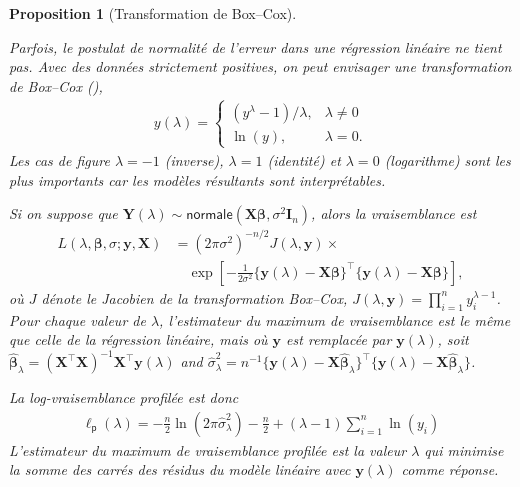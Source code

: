 \documentclass[
  11pt,
  letterpaper,
]{scrbook}
\theoremstyle{definition}
\theoremstyle{plain}
\theoremstyle{definition}
\theoremstyle{plain}
\newtheorem{proposition}{Proposition}[chapter]
\theoremstyle{remark}
\begin{document}
\begin{proposition}[Transformation de
Box--Cox]\protect\hypertarget{prp-boxcox}{}\label{prp-boxcox}

Parfois, le postulat de normalité de l'erreur dans une régression
linéaire ne tient pas. Avec des données strictement positives, on peut
envisager une transformation de Box--Cox
(), \begin{align*}
y(\lambda)= \begin{cases}
(y^{\lambda}-1)/\lambda, & \lambda \neq 0\\
\ln(y), & \lambda=0.
\end{cases}
\end{align*} Les cas de figure \(\lambda=-1\) (inverse), \(\lambda=1\)
(identité) et \(\lambda=0\) (logarithme) sont les plus importants car
les modèles résultants sont interprétables.

Si on suppose que
\(\boldsymbol{Y}(\lambda) \sim \mathsf{normale}(\mathbf{X}\boldsymbol{\beta}, \sigma^2 \mathbf{I}_n)\),
alors la vraisemblance est \begin{align*}
L(\lambda, \boldsymbol{\beta}, \sigma; \boldsymbol{y}, \mathbf{X}) &= (2\pi\sigma^2)^{-n/2} J(\lambda, \boldsymbol{y}) \times\\& \quad \exp \left[ - \frac{1}{2\sigma^2}\{\boldsymbol{y}(\lambda) - \mathbf{X}\boldsymbol{\beta}\}^\top\{\boldsymbol{y}(\lambda) - \mathbf{X}\boldsymbol{\beta}\}\right],
\end{align*} où \(J\) dénote le Jacobien de la transformation Box--Cox,
\(J(\lambda, \boldsymbol{y})=\prod_{i=1}^n y_i^{\lambda-1}\). Pour
chaque valeur de \(\lambda\), l'estimateur du maximum de vraisemblance
est le même que celle de la régression linéaire, mais où
\(\boldsymbol{y}\) est remplacée par \(\boldsymbol{y}(\lambda)\), soit
\(\widehat{\boldsymbol{\beta}}_\lambda = (\mathbf{X}^\top\mathbf{X})^{-1}\mathbf{X}^\top \boldsymbol{y}(\lambda)\)
and
\(\widehat{\sigma}^2_\lambda = n^{-1}\{ \boldsymbol{y}(\lambda) - \mathbf{X}\widehat{\boldsymbol{\beta}}_\lambda\}^\top\{ \boldsymbol{y}(\lambda) - \mathbf{X}\widehat{\boldsymbol{\beta}}_\lambda\}\).

La log-vraisemblance profilée est donc \begin{align*}
\ell_{\mathsf{p}}(\lambda) = -\frac{n}{2}\ln(2\pi \widehat{\sigma}^2_\lambda) - \frac{n}{2} + (\lambda - 1)\sum_{i=1}^n \ln(y_i)
\end{align*} L'estimateur du maximum de vraisemblance profilée est la
valeur \(\lambda\) qui minimise la somme des carrés des résidus du
modèle linéaire avec \(\boldsymbol{y}(\lambda)\) comme réponse.


\end{proposition}
\end{document}

